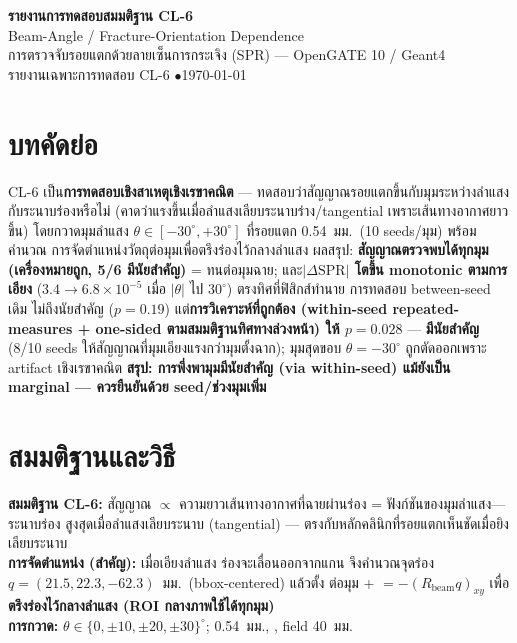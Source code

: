 \documentclass[14pt]{extarticle}
\newcommand{\code}[1]{{\ttfamily\detokenize{#1}}}
\begin{document}
\begin{center}
{\LARGE\bfseries\color{theme} รายงานการทดสอบสมมติฐาน CL-6}\\[3pt]
{\Large Beam-Angle / Fracture-Orientation Dependence}\\[5pt]
{\small การตรวจจับรอยแตกด้วยลายเซ็นการกระเจิง (SPR) --- OpenGATE 10 / Geant4}\\
{\small รายงานเฉพาะการทดสอบ CL-6 \quad$\bullet$\quad \today}
\end{center}
\vspace{2pt}{\color{theme!45}\hrule}\vspace{8pt}

\section*{บทคัดย่อ}
CL-6 เป็น\textbf{การทดสอบเชิงสาเหตุเชิงเรขาคณิต} --- ทดสอบว่าสัญญาณรอยแตกขึ้นกับมุมระหว่างลำแสง
กับระนาบร่องหรือไม่ (คาดว่าแรงขึ้นเมื่อลำแสงเลียบระนาบร่าง/tangential เพราะเส้นทางอากาศยาวขึ้น)
โดยกวาดมุมลำแสง $\theta\in[-30^\circ,+30^\circ]$ ที่รอยแตก 0.54~มม.\ (10 seeds/มุม) พร้อมคำนวณ
การจัดตำแหน่งวัตถุต่อมุมเพื่อตรึงร่องไว้กลางลำแสง ผลสรุป: \textbf{สัญญาณตรวจพบได้ทุกมุม (เครื่องหมายถูก,
5/6 มีนัยสำคัญ)} = ทนต่อมุมฉาย; และ\textbf{$|\Delta\mathrm{SPR}|$ โตขึ้น monotonic ตามการเอียง}
($3.4\to6.8\times10^{-5}$ เมื่อ $|\theta|$ ไป $30^\circ$) ตรงทิศที่ฟิสิกส์ทำนาย การทดสอบ between-seed เดิม
ไม่ถึงนัยสำคัญ ($p=0.19$) แต่\textbf{การวิเคราะห์ที่ถูกต้อง (within-seed repeated-measures + one-sided
ตามสมมติฐานทิศทางล่วงหน้า) ให้ $p=0.028$} --- \textbf{มีนัยสำคัญ} (8/10 seeds ให้สัญญาณที่มุมเอียงแรงกว่ามุมตั้งฉาก);
มุมสุดขอบ $\theta=-30^\circ$ ถูกตัดออกเพราะ artifact เชิงเรขาคณิต
\textbf{สรุป: การพึ่งพามุมมีนัยสำคัญ (via within-seed) แม้ยังเป็น marginal --- ควรยืนยันด้วย seed/ช่วงมุมเพิ่ม}

\section{สมมติฐานและวิธี}
\textbf{สมมติฐาน CL-6:} สัญญาณ $\propto$ ความยาวเส้นทางอากาศที่ฉายผ่านร่อง = ฟังก์ชันของมุมลำแสง---ระนาบร่อง
สูงสุดเมื่อลำแสงเลียบระนาบ (tangential) --- ตรงกับหลักคลินิกที่รอยแตกเห็นชัดเมื่อยิงเลียบระนาบ\\
\textbf{การจัดตำแหน่ง (สำคัญ):} เมื่อเอียงลำแสง ร่องจะเลื่อนออกจากแกน จึงคำนวณจุดร่อง $q=(21.5,22.3,-62.3)$~มม.\
(bbox-centered) แล้วตั้ง \code{src_x/src_z} ต่อมุม + \code{obj_dx/obj_dy}$=-(R_{\text{beam}}q)_{xy}$ เพื่อ
\textbf{ตรึงร่องไว้กลางลำแสง (ROI กลางภาพใช้ได้ทุกมุม)}\\
\textbf{การกวาด:} $\theta\in\{0,\pm10,\pm20,\pm30\}^\circ$; 0.54~มม., \code{n_seeds=10}, field 40~มม.
\end{document}
